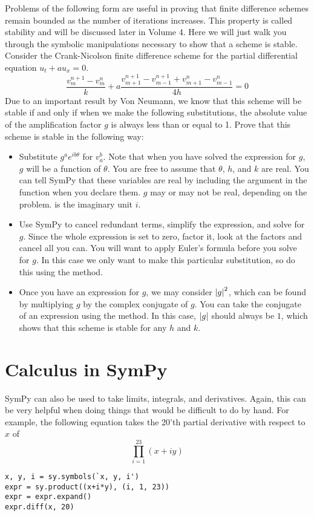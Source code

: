 \begin{problem}
Problems of the following form are useful in proving that finite difference schemes remain bounded as the number of iterations increases.
This property is called stability and will be discussed later in Volume 4.
Here we will just walk you through the symbolic manipulations necessary to show that a scheme is stable.
Consider the Crank-Nicolson finite difference scheme for the partial differential equation $u_t+a u_x=0$.
\begin{equation*}
\frac{v_{m}^{n+1}-v_{m}^{n}}{k}+a \frac{v_{m+1}^{n+1}-v_{m-1}^{n+1}+v_{m+1}^{n}-v_{m-1}^{n}}{4h}=0
\end{equation*}
Due to an important result by Von Neumann, we know that this scheme will be stable if and only if when we make the following substitutions, the absolute value of the amplification factor $g$ is always less than or equal to 1.
Prove that this scheme is stable in the following way:
\begin{itemize}
\item Substitute $g^a e^{i b \theta}$ for $v_a^b$.
Note that when you have solved the expression for $g$, $g$ will be a function of $\theta$.
You are free to assume that $\theta$, $h$, and $k$ are real.
You can tell SymPy that these variables are real by including the argument  in the  function when you declare them.
$g$ may or may not be real, depending on the problem.
 is the imaginary unit $i$.
\item Use SymPy to cancel redundant terms, simplify the expression, and solve for $g$.
Since the whole expression is set to zero, factor it, look at the factors and cancel all you can.
You will want to apply Euler's formula before you solve for $g$.
In this case we only want to make this particular substitution, so do this using the  method.
\item Once you have an expression for $g$, we may consider $\left\lvert g\right\rvert^2$, which can be found by multiplying $g$ by the complex conjugate of $g$. 
You can take the conjugate of an expression using the  method.
In this case, $\left\lvert g\right\rvert$ should always be $1$, which shows that this scheme is stable for any $h$ and $k$.
\end{itemize}
\end{problem}

\section*{Calculus in SymPy}
SymPy can also be used to take limits, integrals, and derivatives.
Again, this can be very helpful when doing things that would be difficult to do by hand.
For example, the following equation takes the 20'th partial derivative with respect to $x$ of 
\begin{equation*}
\prod_{i=1}^{23} \left(x+i y\right)
\end{equation*}
\begin{lstlisting}
x, y, i = sy.symbols(`x, y, i')
expr = sy.product((x+i*y), (i, 1, 23))
expr = expr.expand()
expr.diff(x, 20)
\end{lstlisting}

